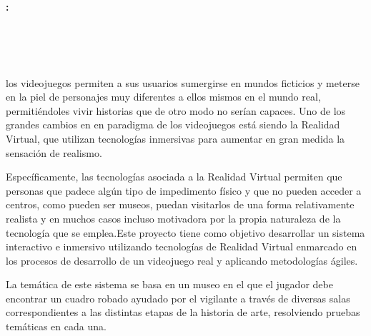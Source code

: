 \chapter*{}



\cleardoublepage
\thispagestyle{empty}

\copyrightpage

\begin{center}
{\large\bfseries \myTitle: \mySubtitle}\\
\end{center}

\begin{center}
\myName \\
\end{center}

\vspace{0.7cm}
\\

\vspace{0.7cm}
\\

los videojuegos permiten a sus usuarios sumergirse en mundos ficticios y meterse en la piel de personajes muy diferentes a ellos mismos en el mundo real, permitiéndoles vivir historias que de otro modo no serían capaces. Uno de los grandes cambios en en paradigma de los videojuegos está siendo la Realidad Virtual, que utilizan tecnologías inmersivas para aumentar en gran medida la sensación de realismo.

\bigskip

Específicamente, las tecnologías asociada a la Realidad Virtual permiten que personas que padece algún tipo de impedimento físico y que no pueden acceder a centros, como pueden ser museos, puedan visitarlos de una forma relativamente realista y en muchos casos incluso motivadora por la propia naturaleza de la tecnología que se emplea.Este proyecto tiene como objetivo desarrollar un sistema interactivo e inmersivo utilizando tecnologías de Realidad Virtual enmarcado en los procesos de desarrollo de un videojuego real y aplicando metodologías ágiles.

\bigskip

La temática de este sistema se basa en un museo en el que el jugador debe encontrar un cuadro robado ayudado por el vigilante a través de diversas salas correspondientes a las distintas etapas de la historia de arte, resolviendo pruebas temáticas en cada una.


